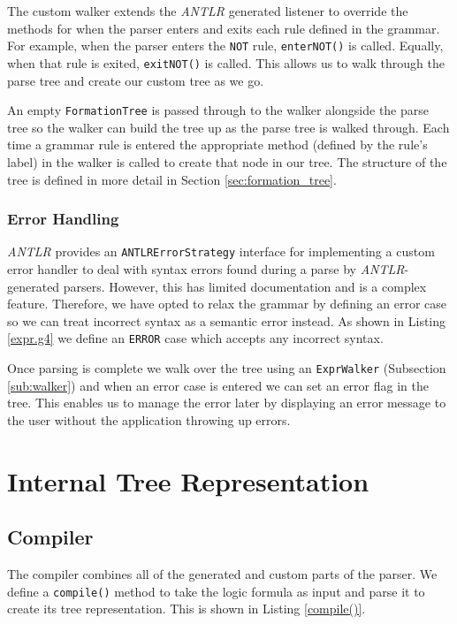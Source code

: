 \documentclass[draft]{report}
\begin{document}
The custom walker extends the \emph{ANTLR} generated listener to override the methods for when the parser enters and exits each rule defined in the grammar. For example, when the parser enters the {\tt NOT} rule, {\tt enterNOT()} is called. Equally, when that rule is exited, {\tt exitNOT()} is called. This allows us to walk through the parse tree and create our custom tree as we go.

An empty {\tt FormationTree} is passed through to the walker alongside the parse tree so the walker can build the tree up as the parse tree is walked through. Each time a grammar rule is entered the appropriate method (defined by the rule's label) in the walker is called to create that node in our tree. The structure of the tree is defined in more detail in Section \ref{sec:formation_tree}.

\subsection{Error Handling}
\label{sub:error_handling}

\emph{ANTLR} provides an {\tt ANTLRErrorStrategy} interface for implementing a custom error handler to deal with syntax errors found during a parse by \emph{ANTLR}-generated parsers. However, this has limited documentation and is a complex feature. Therefore, we have opted to relax the grammar by defining an error case so we can treat incorrect syntax as a semantic error instead. As shown in Listing \ref{expr.g4} we define an {\tt ERROR} case which accepts any incorrect syntax. 

Once parsing is complete we walk over the tree using an {\tt ExprWalker} (Subsection \ref{sub:walker}) and when an error case is entered we can set an error flag in the tree. This enables us to manage the error later by displaying an error message to the user without the application throwing up errors.

\chapter{Internal Tree Representation}
\label{chap:internal_tree_representation}

\section{Compiler}
\label{sec:compiler}

The compiler combines all of the generated and custom parts of the parser. We define a {\tt compile()} method to take the logic formula as input and parse it to create its tree representation. This is shown in Listing \ref{compile()}.
\end{document}
